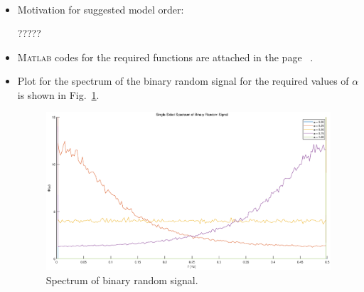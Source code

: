 \documentclass[10pt,a4paper]{article}
\begin{document}
\begin{itemize}
\begin{align*}
	\end{align*}
    \item Motivation for suggested model order:
    \par ?????
    \item \textsc{Matlab} codes for the required functions are attached in the page ~\pageref{matlabCode}.
    \item Plot for the spectrum of the binary random signal for the required values of $\alpha$ is shown in Fig.~\ref{fig:binarySpectrum}.
	\begin{figure}[h]
		\footnotesize
		\centering 
		\includegraphics[width=0.8\columnwidth]{binarySpectrum.eps} 
		\caption{Spectrum of binary random signal.}
		\label{fig:binarySpectrum}
	\end{figure}
\end{itemize}

\end{document}
